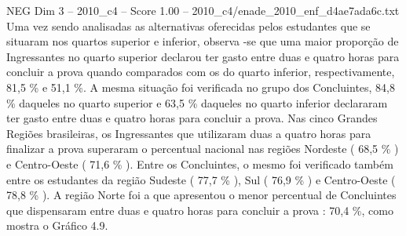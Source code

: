 \begin{textsample}{NEG Dim 3 – 2010\_c4 – Score 1.00 – 2010\_c4/enade\_2010\_enf\_d4ae7ada6c.txt}
Uma vez sendo analisadas as alternativas oferecidas pelos estudantes que se situaram nos quartos superior e inferior, observa -se que uma maior proporção de Ingressantes no quarto superior declarou ter gasto entre duas e quatro horas para concluir a prova quando comparados com os do quarto inferior, respectivamente, 81,5 \% e 51,1 \%.
A mesma situação foi verificada no grupo dos Concluintes, 84,8 \% daqueles no quarto superior e 63,5 \% daqueles no quarto inferior declararam ter gasto entre duas e quatro horas para concluir a prova.
Nas cinco Grandes Regiões brasileiras, os Ingressantes que utilizaram duas a quatro horas para finalizar a prova superaram o percentual nacional nas regiões Nordeste ( 68,5 \% ) e Centro-Oeste ( 71,6 \% ).
Entre os Concluintes, o mesmo foi verificado também entre os estudantes da região Sudeste ( 77,7 \% ), Sul ( 76,9 \% ) e Centro-Oeste ( 78,8 \% ).
A região Norte foi a que apresentou o menor percentual de Concluintes que dispensaram entre duas e quatro horas para concluir a prova : 70,4 \%, como mostra o Gráfico 4.9.

\end{textsample}
